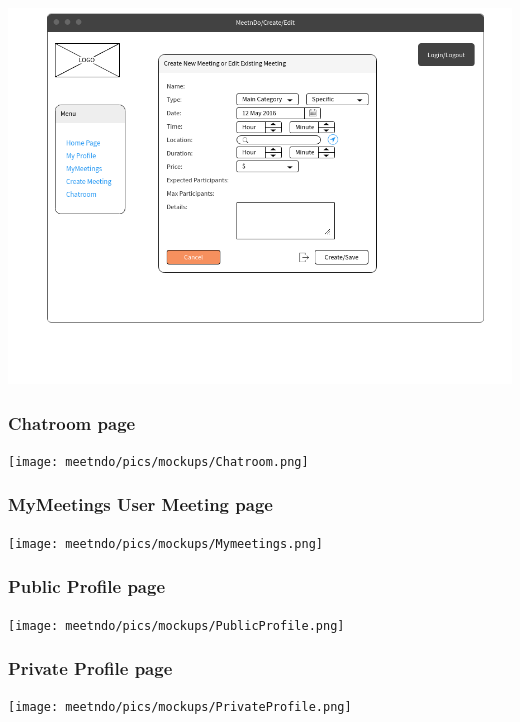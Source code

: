 \documentclass[conference]{IEEEtran}
\begin{document}
\includegraphics[scale=0.3]{mockups/Create_edit}

\subsubsection{Chatroom page} \hspace{10cm}

\texttt{[image: meetndo/pics/mockups/Chatroom.png]}

\subsubsection{MyMeetings User Meeting page} \hspace{10cm}

\texttt{[image: meetndo/pics/mockups/Mymeetings.png]}

\subsubsection{Public Profile page} \hspace{10cm}

\texttt{[image: meetndo/pics/mockups/PublicProfile.png]}

\subsubsection{Private Profile page} \hspace{10cm}

\texttt{[image: meetndo/pics/mockups/PrivateProfile.png]}
\end{document}
